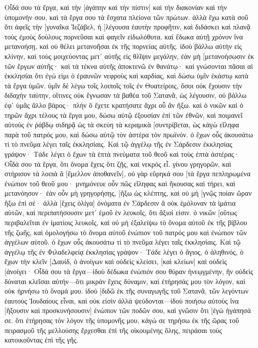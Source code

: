 Οἶδά σου τὰ ἔργα, καὶ τὴν [ἀγάπην καὶ τὴν πίστιν] καὶ τὴν διακονίαν καὶ τὴν ὑπομονήν σου, καὶ τὰ ἔργα σου τὰ ἔσχατα πλείονα τῶν πρώτων. 
ἀλλὰ ἔχω κατὰ σοῦ ὅτι ἀφεῖς τὴν [γυναῖκα Ἰεζάβελ, ἡ [λέγουσα ἑαυτὴν προφῆτιν, καὶ διδάσκει καὶ πλανᾷ τοὺς ἐμοὺς δούλους πορνεῦσαι καὶ φαγεῖν εἰδωλόθυτα. 
καὶ ἔδωκα αὐτῇ χρόνον ἵνα μετανοήσῃ, καὶ οὐ θέλει μετανοῆσαι ἐκ τῆς πορνείας αὐτῆς. 
ἰδοὺ βάλλω αὐτὴν εἰς κλίνην, καὶ τοὺς μοιχεύοντας μετ᾽ αὐτῆς εἰς θλῖψιν μεγάλην, ἐὰν μὴ [μετανοήσωσιν ἐκ τῶν ἔργων αὐτῆς· 
καὶ τὰ τέκνα αὐτῆς ἀποκτενῶ ἐν θανάτῳ· καὶ γνώσονται πᾶσαι αἱ ἐκκλησίαι ὅτι ἐγώ εἰμι ὁ ἐραυνῶν νεφροὺς καὶ καρδίας, καὶ δώσω ὑμῖν ἑκάστῳ κατὰ τὰ ἔργα ὑμῶν. 
ὑμῖν δὲ λέγω τοῖς λοιποῖς τοῖς ἐν Θυατείροις, ὅσοι οὐκ ἔχουσιν τὴν διδαχὴν ταύτην, οἵτινες οὐκ ἔγνωσαν τὰ βαθέα τοῦ Σατανᾶ, ὡς λέγουσιν, οὐ βάλλω ἐφ᾽ ὑμᾶς ἄλλο βάρος· 
πλὴν ὃ ἔχετε κρατήσατε ἄχρι οὗ ἂν ἥξω. 
καὶ ὁ νικῶν καὶ ὁ τηρῶν ἄχρι τέλους τὰ ἔργα μου, δώσω αὐτῷ ἐξουσίαν ἐπὶ τῶν ἐθνῶν, 
καὶ ποιμανεῖ αὐτοὺς ἐν ῥάβδῳ σιδηρᾷ ὡς τὰ σκεύη τὰ κεραμικὰ [συντρίβεται, 
ὡς κἀγὼ εἴληφα παρὰ τοῦ πατρός μου, καὶ δώσω αὐτῷ τὸν ἀστέρα τὸν πρωϊνόν. 
ὁ ἔχων οὖς ἀκουσάτω τί τὸ πνεῦμα λέγει ταῖς ἐκκλησίαις. 
Καὶ τῷ ἀγγέλῳ τῆς ἐν Σάρδεσιν ἐκκλησίας γράψον· Τάδε λέγει ὁ ἔχων τὰ ἑπτὰ πνεύματα τοῦ θεοῦ καὶ τοὺς ἑπτὰ ἀστέρας· Οἶδά σου τὰ ἔργα, ὅτι ὄνομα ἔχεις ὅτι ζῇς, καὶ νεκρὸς εἶ. 
γίνου γρηγορῶν, καὶ στήρισον τὰ λοιπὰ ἃ [ἔμελλον ἀποθανεῖν], οὐ γὰρ εὕρηκά σου [τὰ ἔργα πεπληρωμένα ἐνώπιον τοῦ θεοῦ μου· 
μνημόνευε οὖν πῶς εἴληφας καὶ ἤκουσας καὶ τήρει, καὶ μετανόησον· ἐὰν οὖν μὴ γρηγορήσῃς, [ἥξω ὡς κλέπτης, καὶ οὐ μὴ [γνῷς ποίαν ὥραν ἥξω ἐπὶ σέ· 
ἀλλὰ [ἔχεις ὀλίγα] ὀνόματα ἐν Σάρδεσιν ἃ οὐκ ἐμόλυναν τὰ ἱμάτια αὐτῶν, καὶ περιπατήσουσιν μετ᾽ ἐμοῦ ἐν λευκοῖς, ὅτι ἄξιοί εἰσιν. 
ὁ νικῶν [οὕτως περιβαλεῖται ἐν ἱματίοις λευκοῖς, καὶ οὐ μὴ ἐξαλείψω τὸ ὄνομα αὐτοῦ ἐκ τῆς βίβλου τῆς ζωῆς, καὶ ὁμολογήσω τὸ ὄνομα αὐτοῦ ἐνώπιον τοῦ πατρός μου καὶ ἐνώπιον τῶν ἀγγέλων αὐτοῦ. 
ὁ ἔχων οὖς ἀκουσάτω τί τὸ πνεῦμα λέγει ταῖς ἐκκλησίαις. 
Καὶ τῷ ἀγγέλῳ τῆς ἐν Φιλαδελφείᾳ ἐκκλησίας γράψον· Τάδε λέγει ὁ ἅγιος, ὁ ἀληθινός, ὁ ἔχων τὴν κλεῖν [Δαυίδ, ὁ ἀνοίγων καὶ οὐδεὶς κλείσει, [καὶ κλείων] καὶ οὐδεὶς [ἀνοίγει· 
Οἶδά σου τὰ ἔργα—ἰδοὺ δέδωκα ἐνώπιόν σου θύραν ἠνεῳγμένην, ἣν οὐδεὶς δύναται κλεῖσαι αὐτήν—ὅτι μικρὰν ἔχεις δύναμιν, καὶ ἐτήρησάς μου τὸν λόγον, καὶ οὐκ ἠρνήσω τὸ ὄνομά μου. 
ἰδοὺ [διδῶ ἐκ τῆς συναγωγῆς τοῦ Σατανᾶ, τῶν λεγόντων ἑαυτοὺς Ἰουδαίους εἶναι, καὶ οὐκ εἰσὶν ἀλλὰ ψεύδονται—ἰδοὺ ποιήσω αὐτοὺς ἵνα [ἥξουσιν καὶ προσκυνήσουσιν] ἐνώπιον τῶν ποδῶν σου, καὶ γνῶσιν ὅτι [ἐγὼ ἠγάπησά σε. 
ὅτι ἐτήρησας τὸν λόγον τῆς ὑπομονῆς μου, κἀγώ σε τηρήσω ἐκ τῆς ὥρας τοῦ πειρασμοῦ τῆς μελλούσης ἔρχεσθαι ἐπὶ τῆς οἰκουμένης ὅλης, πειράσαι τοὺς κατοικοῦντας ἐπὶ τῆς γῆς. 
